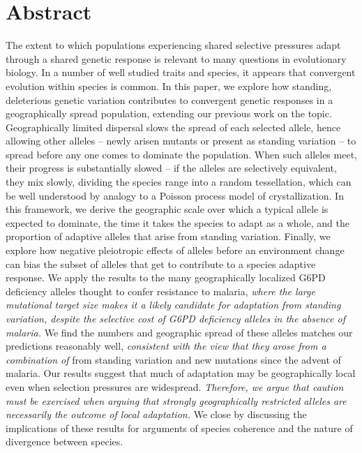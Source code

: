 \documentclass{article}
\newcommand{\mfp}[1]{{\it\color{red} #1} }
\begin{document}
\section*{Abstract}
The extent to which populations experiencing shared selective pressures
adapt through a shared genetic response
is relevant to many questions in evolutionary biology. 
In a number of well studied traits and species, 
it appears that convergent evolution within species is common. 
In this paper, 
we explore how standing, deleterious genetic variation contributes to
convergent genetic responses in a geographically spread population,
extending our previous work on the topic.
Geographically limited dispersal slows the spread of each selected allele,
hence allowing other alleles 
-- newly arisen mutants or present as standing variation -- 
to spread before any one comes to dominate the population. 
When such alleles meet, their progress is substantially slowed 
-- if the alleles are selectively equivalent, 
they mix slowly, dividing the species range into a random tessellation,
which can be well understood by analogy to a Poisson process model of crystallization. 
In this framework, 
we derive the geographic scale over which a typical allele is expected to dominate, 
the time it takes the species to adapt as a whole,
and the proportion of adaptive alleles that arise from standing variation.
Finally, we explore how negative pleiotropic effects of alleles before an environment change 
can bias the subset of alleles that get to contribute to a species adaptive response. 
We apply the results to the many geographically localized G6PD
deficiency alleles thought to confer resistance to malaria, \mfp{where the large
mutational target size makes it a likely candidate for adaptation
from standing variation, despite the selective cost of G6PD
deficiency alleles in the absence of malaria.}
We find the numbers and geographic spread of these alleles matches our predictions reasonably well,
\mfp{consistent with the view that they arose from a combination of} from standing variation and new mutations since the advent of malaria.
Our results suggest that much of adaptation may be geographically local 
even when selection pressures are widespread. \mfp{Therefore, we argue
that caution must be exercised when arguing that strongly
geographically restricted alleles are necessarily the outcome of local adaptation.}
We close by discussing the implications of these results for arguments of species coherence and the nature of divergence between species. 


\end{document}
